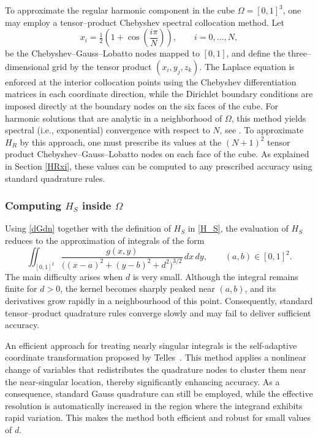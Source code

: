\documentclass[12pt,oneside,reqno]{amsart}%
\theoremstyle{plain}
\numberwithin{equation}{section}
\begin{document}
To approximate the regular harmonic component in the cube 
$\Omega=[0,1]^3$, one may employ a tensor–product Chebyshev 
spectral collocation method.  Let 
\[
x_i=\tfrac12\!\left(1+\cos\!\left(\frac{i\pi}{N}\right)\right),
\qquad i=0,\dots,N,
\]
be the Chebyshev–Gauss–Lobatto nodes mapped to $[0,1]$, and 
define the three–dimensional grid by the tensor product 
$(x_i,y_j,z_k)$.  The Laplace equation is enforced at the 
interior collocation points using the Chebyshev differentiation 
matrices in each coordinate direction, while the Dirichlet 
boundary conditions are imposed directly at the boundary nodes 
on the six faces of the cube.  For harmonic solutions that are 
analytic in a neighborhood of $\Omega$, this method 
yields spectral (i.e., exponential) convergence with respect to $N$, see \cite{Canuto}. To approximate $H_R$ by this approach, one must prescribe 
its values at the $(N+1)^2$ tensor product 
Chebyshev–Gauss–Lobatto nodes on each face of the cube. As explained in Section \ref{HRxi}, these values can be computed to any prescribed 
accuracy using standard quadrature rules.
\fi

\subsubsection{Computing $H_S$ inside $\Omega$}\label{CompHS}\hfill

Using \eqref{dGdn} together with the definition of $H_S$ in \eqref{H_S},
the evaluation of $H_S$ reduces to the approximation of integrals of the form
\begin{equation}
\iint_{[0,1]^2}
\frac{g(x,y)}{\big((x-a)^2+(y-b)^2+d^2\big)^{3/2}}
\, dx\, dy,
\qquad (a,b)\in [0,1]^2.
\label{Intabd}
\end{equation}
The main difficulty arises when $d$ is very small. Although the integral
remains finite for $d>0$, the kernel becomes sharply peaked near $(a,b)$,
and its derivatives grow rapidly in a neighbourhood of this point.
Consequently, standard tensor–product quadrature rules converge slowly
and may fail to deliver sufficient accuracy.

An efficient approach for treating nearly singular integrals 
is the self-adaptive coordinate transformation proposed by 
Telles~\cite{Telles}. 
This method applies a nonlinear change of variables 
that redistributes the quadrature nodes to cluster them 
near the near-singular location, thereby significantly enhancing accuracy. 
As a consequence, standard Gauss quadrature can still be employed, 
while the effective resolution is automatically increased 
in the region where the integrand exhibits rapid variation. 
This makes the method both efficient and robust for small values of $d$.
\end{document}
